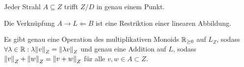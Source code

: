 \documentclass{report}
\begin{document}
\begin{theorem}
	Jeder Strahl $A \subseteq Z$ trifft $Z/D$ in genau einem Punkt.
\end{theorem}
\begin{corollary}
	Die Verknüpfung $A \rightarrow L \Leftarrow B$ ist eine Restriktion einer linearen Abbildung.
\end{corollary}
\begin{corollary}
	Es gibt genau eine Operation des multiplikativen Monoids $\mathbb{R}_{\geq 0}$ auf  $L_Z$, sodass $\forall \lambda \in \mathbb{R} : \lambda \norm{v}_Z = \norm{\lambda v}_Z$ und genau eine Addition auf $L$, sodass $\norm{v}_Z + \norm{w}_Z = \norm{v + w}_Z$ für alle $v,w \in A \subset Z$.
\end{corollary}
\end{document}
